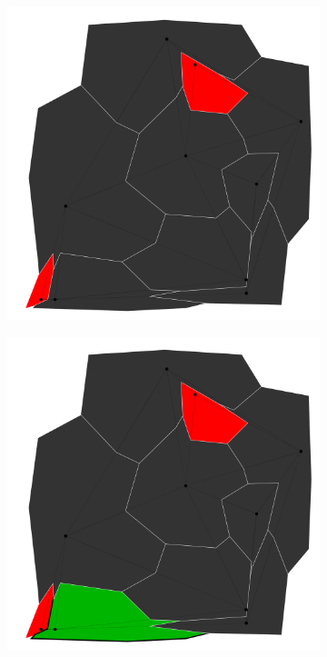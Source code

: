 \documentclass{article}
\begin{document}
\begin{figure}[h!]
\begin{subfigure}{0.18\textwidth}
				\includegraphics[width=\textwidth]{images/sequences/simple_backtracking/bt_simple_I00002}
				\caption{}
				\label{btb}
			\end{subfigure}
			\;
			\begin{subfigure}{0.18\textwidth}
				\centering
				\includegraphics[width=\textwidth]{images/sequences/simple_backtracking/bt_simple_I00004}

\end{subfigure}
\end{figure}
\end{document}
